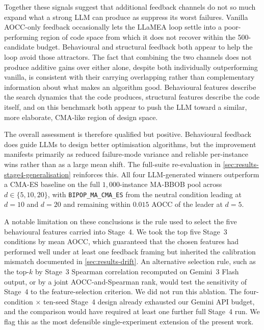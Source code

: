 Together these signals suggest that additional feedback channels do not so much expand what a strong LLM can produce as suppress its worst failures. Vanilla AOCC-only feedback occasionally lets the LLaMEA loop settle into a poor-performing region of code space from which it does not recover within the 500-candidate budget. Behavioural and structural feedback both appear to help the loop avoid those attractors. The fact that combining the two channels does not produce additive gains over either alone, despite both individually outperforming vanilla, is consistent with their carrying overlapping rather than complementary information about what makes an algorithm good. Behavioural features describe the search dynamics that the code produces, structural features describe the code itself, and on this benchmark both appear to push the LLM toward a similar, more elaborate, CMA-like region of design space.

The overall assessment is therefore qualified but positive. Behavioural feedback does guide LLMs to design better optimisation algorithms, but the improvement manifests primarily as reduced failure-mode variance and reliable per-instance wins rather than as a large mean shift. The full-suite re-evaluation in \cref{sec:results-stage4-generalisation} reinforces this. All four LLM-generated winners outperform a CMA-ES baseline on the full $1{,}000$-instance MA-BBOB pool across $d \in \{5, 10, 20\}$, with \texttt{BIPOP\_MA\_CMA\_ES} from the neutral condition leading at $d = 10$ and $d = 20$ and remaining within $0.015$ AOCC of the leader at $d = 5$.

A notable limitation on these conclusions is the rule used to select the five behavioural features carried into Stage~4. We took the top five Stage~3 conditions by mean AOCC, which guaranteed that the chosen features had performed well under at least one feedback framing but inherited the calibration mismatch documented in \cref{sec:results-drift}. An alternative selection rule, such as the top-$k$ by Stage~3 Spearman correlation recomputed on Gemini~3 Flash output, or by a joint AOCC-and-Spearman rank, would test the sensitivity of Stage~4 to the feature-selection criterion. We did not run this ablation. The four-condition $\times$ ten-seed Stage~4 design already exhausted our Gemini API budget, and the comparison would have required at least one further full Stage~4 run. We flag this as the most defensible single-experiment extension of the present work.

